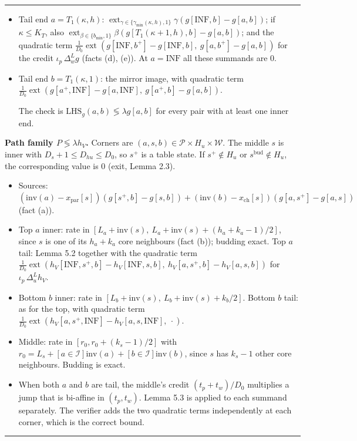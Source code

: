 \documentclass[11pt]{article}
\theoremstyle{remark}
\numberwithin{equation}{section}
\newenvironment{transcription}{\par\medskip\noindent\rule{\linewidth}{0.4pt}\par\nopagebreak}{\par\nopagebreak\noindent\rule{\linewidth}{0.4pt}\par\medskip}
\begin{document}
\begin{transcription}
\begin{itemize}
\begin{itemize}
\item Tail end $a = T_1(\kappa, h)$: $\mathop{\mathrm{ext}}_{\gamma \in \{\gamma_{\min}(\kappa, h), 1\}}\gamma(g[\mathrm{INF}, b] - g[a, b])$; if $\kappa \le K_T$, also $\mathop{\mathrm{ext}}_{\beta \in \{b_{\min}, 1\}}\beta(g[T_1(\kappa+1, h), b] - g[a, b])$; and the quadratic term $\frac{1}{D_0}\mathop{\mathrm{ext}}(g[\mathrm{INF}, b^+] - g[\mathrm{INF}, b],\ g[a, b^+] - g[a, b])$ for the credit $\iota_p\,\Delta^L_w g$ (facts (d), (e)). At $a = \mathrm{INF}$ all these summands are $0$.
\item Tail end $b = T_1(\kappa, 1)$: the mirror image, with quadratic term $\frac{1}{D_0}\mathop{\mathrm{ext}}(g[a^+, \mathrm{INF}] - g[a, \mathrm{INF}],\ g[a^+, b] - g[a, b])$.

  The check is $\mathrm{LHS}_g(a, b) \lessgtr \lambda g[a, b]$ for every pair with at least one inner end.
\end{itemize}
\end{itemize}

\textbf{Path family $P \lessgtr \lambda h_V$.} Corners are $(a, s, b) \in \mathcal{P} \times H_u \times \mathcal{W}$. The middle $s$ is inner with $D_s + 1 \le D_{hu} \le D_0$, so $s^+$ is a table state. If $s^+ \notin H_u$ or $s^{\mathrm{bud}} \notin H_u$, the corresponding value is $0$ (exit, Lemma 2.3).
\begin{itemize}
\item Sources: $(\mathrm{inv}(a) - x_{\mathrm{par}}[s])(g[s^+, b] - g[s, b]) + (\mathrm{inv}(b) - x_{\mathrm{ch}}[s])(g[a, s^+] - g[a, s])$ (fact (a)).
\item Top $a$ inner: rate in $[L_a + \mathrm{inv}(s),\ L_a + \mathrm{inv}(s) + (h_a + k_a - 1)/2]$, since $s$ is one of its $h_a + k_a$ core neighbours (fact (b)); budding exact. Top $a$ tail: Lemma 5.2 together with the quadratic term $\frac{1}{D_0}\mathop{\mathrm{ext}}(h_V[\mathrm{INF}, s^+, b] - h_V[\mathrm{INF}, s, b],\ h_V[a, s^+, b] - h_V[a, s, b])$ for $\iota_p\,\Delta^L_u h_V$.
\item Bottom $b$ inner: rate in $[L_b + \mathrm{inv}(s),\ L_b + \mathrm{inv}(s) + k_b/2]$. Bottom $b$ tail: as for the top, with quadratic term $\frac{1}{D_0}\mathop{\mathrm{ext}}(h_V[a, s^+, \mathrm{INF}] - h_V[a, s, \mathrm{INF}],\ \cdot)$.
\item Middle: rate in $[r_0, r_0 + (k_s - 1)/2]$ with $r_0 = L_s + [a \in \mathcal{I}]\mathrm{inv}(a) + [b \in \mathcal{I}]\mathrm{inv}(b)$, since $s$ has $k_s - 1$ other core neighbours. Budding is exact.
\item When both $a$ and $b$ are tail, the middle's credit $(t_p + t_w)/D_0$ multiplies a jump that is bi-affine in $(t_p, t_w)$. Lemma 5.3 is applied to each summand separately. The verifier adds the two quadratic terms independently at each corner, which is the correct bound.
\end{itemize}


\end{transcription}
\end{document}
